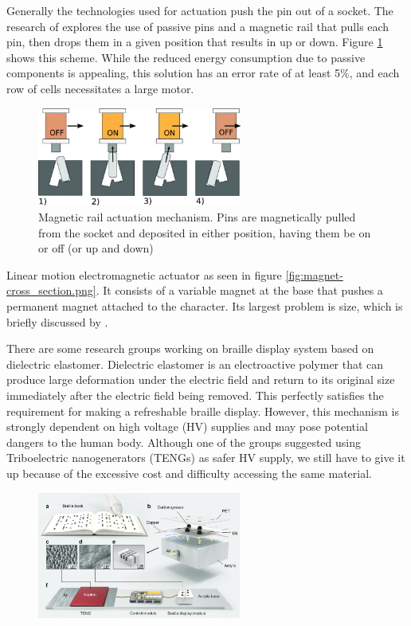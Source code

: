 Generally the technologies used for actuation push the pin out of a socket.
The research of \cite{loconsole_braillecursor_2019} explores the use of passive pins and a magnetic rail that pulls each pin, then drops them in a given position that results in up or down. Figure \ref{fig:magnetic-rail} shows this scheme.
While the reduced energy consumption due to passive components is appealing, this solution has an error rate of at least 5\%, and each row of cells necessitates a large motor.
\begin{figure}
\centering
    \includegraphics[width=0.6\textwidth]{figures/magnetic-rail.jpg}
\caption{Magnetic rail actuation mechanism. Pins are magnetically pulled from the socket and deposited in either position, having them be on or off (or up and down)}
\label{fig:magnetic-rail}
\end{figure}  

Linear motion electromagnetic actuator as seen in figure \ref{fig:magnet-cross_section.png}.
It consists of a variable magnet at the base that pushes a permanent magnet attached to the character. Its largest problem is size, which is briefly discussed by \cite{BettelaniGemmaCarolina2020DaVo}.

There are some research groups working on braille display system based on dielectric elastomer. Dielectric elastomer is an electroactive polymer that can produce large deformation under the electric field and return to its original size immediately after the electric field being removed. This perfectly satisfies the requirement for making a refreshable braille display. However, this mechanism is strongly dependent on high voltage (HV) supplies and may pose potential dangers to the human body. Although one of the groups suggested using Triboelectric nanogenerators (TENGs) as safer HV supply, we still have to give it up because of the excessive cost and difficulty accessing the same material. 

\begin{figure}\centering
    \includegraphics[width=0.6\textwidth]{figures/teng.png}
\caption{}
\label{fig:teng.png}
\end{figure}

